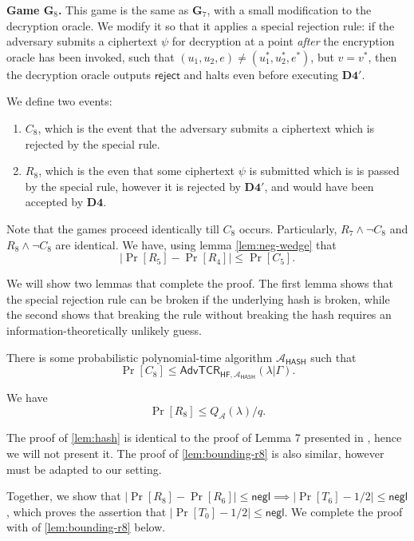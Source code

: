 \documentclass[10pt,a4paper]{article}
\newcommand{\adv}{\mathcal{A}}
\newcommand{\negl}{\mathsf{negl}}
\newcommand{\game}{\mathbf{G}}
\newcommand{\dstep}[1]{\mathbf{D#1}}
\begin{document}
	\textbf{Game $\game_8$.} This game is the same as $\game_7$, with a small modification to the decryption oracle. We modify it so that it applies a special rejection rule: if the adversary submits a ciphertext $\psi$ for decryption at a point \textit{after} the encryption oracle has been invoked, such that $(u_1, u_2, e)\neq (u_1^{*}, u_2^{*}, e^{*})$, but $v = v^{*}$, then the decryption oracle outputs $\mathsf{reject}$ and halts even before executing $\dstep{4}'$.
	
	We define two events:
	\begin{enumerate}
		\item $C_8$, which is the event that the adversary submits a ciphertext which is rejected by the special rule.
		\item $R_8$, which is the even that some ciphertext $\psi$ is submitted which is is passed by the special rule, however it is rejected by $\dstep{4}'$, and would have been accepted by $\dstep{4}$.
	\end{enumerate}

	Note that the games proceed identically till $C_8$ occurs. Particularly, $R_7\wedge\neg C_8$ and $R_8\wedge\neg C_8$ are identical. We have, using lemma \cref{lem:neg-wedge} that
	$$|\Pr[R_5]-\Pr[R_4]|\leq\Pr[C_5].$$
	
	We will show two lemmas that complete the proof. The first lemma shows that the special rejection rule can be broken if the underlying hash is broken, while the second shows that breaking the rule without breaking the hash requires an information-theoretically unlikely guess.
	
	\begin{lemma}
		\label{lem:hash}
		There is some probabilistic polynomial-time algorithm $\adv_\mathsf{HASH}$ such that $$\Pr[C_8]\leq\mathsf{AdvTCR}_{\mathsf{HF},\adv_\mathsf{HASH}}(\lambda|\Gamma).$$
	\end{lemma}

	\begin{lemma}
		\label{lem:bounding-r8}
		We have $$\Pr[R_8]\leq Q_\adv(\lambda)/q.$$
	\end{lemma}

	The proof of \cref{lem:hash} is identical to the proof of Lemma 7 presented in \cite{cs01}, hence we will not present it. The proof of \cref{lem:bounding-r8} is also similar, however must be adapted to our setting. 
	
	Together, we show that $|\Pr[R_8]-\Pr[R_6]|\leq\negl\implies|\Pr[T_6]-1/2|\leq\negl$, which proves the assertion that $|\Pr[T_0]-1/2|\leq\negl$. We complete the proof with of \cref{lem:bounding-r8} below.
	
\end{document}

